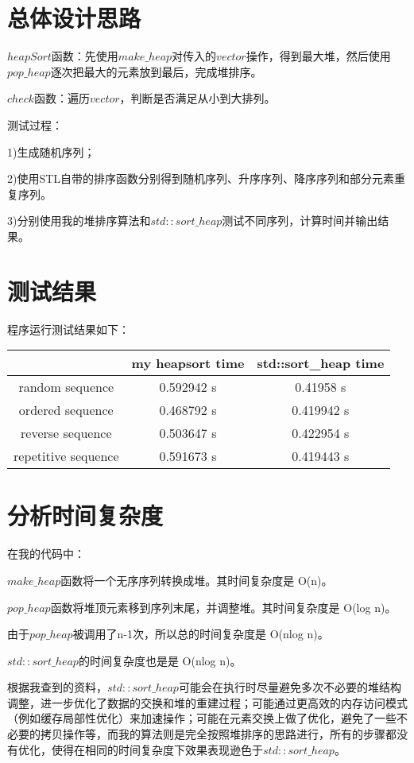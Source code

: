 \documentclass[UTF8]{ctexart}
\begin{document}
\pagestyle{fancy}
\fancyhead{}

\section{总体设计思路}
$heapSort$函数：先使用$make\_heap$对传入的$vector$操作，得到最大堆，然后使用$pop\_heap$逐次把最大的元素放到最后，完成堆排序。\par
$check$函数：遍历$vector$，判断是否满足从小到大排列。\par
测试过程：\par
1)生成随机序列；\par
2)使用STL自带的排序函数分别得到随机序列、升序序列、降序序列和部分元素重复序列。\par
3)分别使用我的堆排序算法和$std::sort\_heap$测试不同序列，计算时间并输出结果。\par
\section{测试结果}
程序运行测试结果如下：
\begin{table}[H]
    \centering
    \begin{tabular}{|c|c|c|}
    \hline
    \textbf{}           & \textbf{my heapsort time} & \textbf{std::sort\_heap time} \\ \hline
    random sequence     & 0.592942 s                & 0.41958 s                     \\ \hline
    ordered sequence    & 0.468792 s                & 0.419942 s                    \\ \hline
    reverse sequence    & 0.503647 s                & 0.422954 s                    \\ \hline
    repetitive sequence & 0.591673 s                & 0.419443 s                    \\ \hline
    \end{tabular}
\end{table}
\section{分析时间复杂度}
在我的代码中：\par
$make\_heap$函数将一个无序序列转换成堆。其时间复杂度是 O(n)。\par
$pop\_heap$函数将堆顶元素移到序列末尾，并调整堆。其时间复杂度是 O(log n)。\par
由于$pop\_heap$被调用了n-1次，所以总的时间复杂度是 O(nlog n)。\par

$std::sort\_heap$的时间复杂度也是是 O(nlog n)。\par
根据我查到的资料，$std::sort\_heap$可能会在执行时尽量避免多次不必要的堆结构调整，进一步优化了数据的交换和堆的重建过程；可能通过更高效的内存访问模式（例如缓存局部性优化）来加速操作；可能在元素交换上做了优化，避免了一些不必要的拷贝操作等，而我的算法则是完全按照堆排序的思路进行，所有的步骤都没有优化，使得在相同的时间复杂度下效果表现逊色于$std::sort\_heap$。
\end{document}
